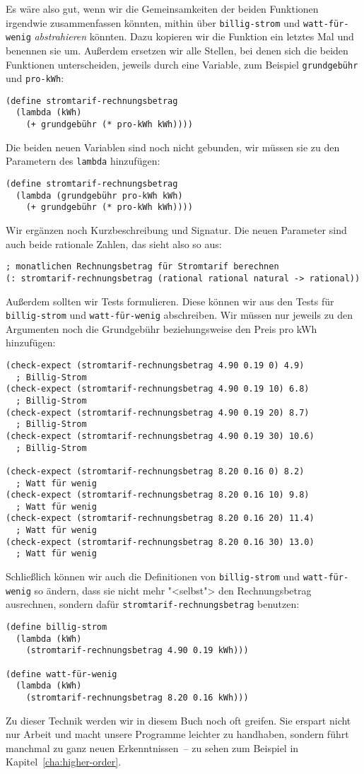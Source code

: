Es wäre also gut, wenn wir die Gemeinsamkeiten der beiden Funktionen
irgendwie zusammenfassen könnten, mithin über \lstinline{billig-strom}
und \lstinline{watt-für-wenig} \textit{abstrahieren}
könnten.  Dazu kopieren wir die Funktion ein letztes Mal und benennen
sie um.  Außerdem ersetzen wir alle Stellen, bei denen sich die beiden
Funktionen unterscheiden, jeweils durch eine Variable, zum Beispiel
\lstinline{grundgebühr} und \lstinline{pro-kWh}:
%
\begin{lstlisting}
(define stromtarif-rechnungsbetrag
  (lambda (kWh)
    (+ grundgebühr (* pro-kWh kWh))))
\end{lstlisting}
%
Die beiden neuen Variablen sind noch nicht gebunden, wir müssen sie zu
den Parametern des \lstinline{lambda} hinzufügen:
%
\begin{lstlisting}
(define stromtarif-rechnungsbetrag
  (lambda (grundgebühr pro-kWh kWh)
    (+ grundgebühr (* pro-kWh kWh))))
\end{lstlisting}
%
Wir ergänzen noch Kurzbeschreibung und Signatur.  Die neuen Parameter
sind auch beide rationale Zahlen, das sieht also so aus:
%
\begin{lstlisting}
; monatlichen Rechnungsbetrag für Stromtarif berechnen
(: stromtarif-rechnungsbetrag (rational rational natural -> rational))
\end{lstlisting}
%
Außerdem sollten wir Tests formulieren.  Diese können wir aus den
Tests für \lstinline{billig-strom} und \lstinline{watt-für-wenig}
abschreiben.
Wir müssen nur jeweils zu den Argumenten noch die Grundgebühr
beziehungsweise den Preis pro kWh hinzufügen:
%
\begin{lstlisting}
(check-expect (stromtarif-rechnungsbetrag 4.90 0.19 0) 4.9)
  ; Billig-Strom
(check-expect (stromtarif-rechnungsbetrag 4.90 0.19 10) 6.8)  
  ; Billig-Strom
(check-expect (stromtarif-rechnungsbetrag 4.90 0.19 20) 8.7)  
  ; Billig-Strom
(check-expect (stromtarif-rechnungsbetrag 4.90 0.19 30) 10.6) 
  ; Billig-Strom

(check-expect (stromtarif-rechnungsbetrag 8.20 0.16 0) 8.2)
  ; Watt für wenig
(check-expect (stromtarif-rechnungsbetrag 8.20 0.16 10) 9.8)
  ; Watt für wenig
(check-expect (stromtarif-rechnungsbetrag 8.20 0.16 20) 11.4)
  ; Watt für wenig
(check-expect (stromtarif-rechnungsbetrag 8.20 0.16 30) 13.0)
  ; Watt für wenig
\end{lstlisting}
%
Schließlich können wir auch die Definitionen von \lstinline{billig-strom}
und \lstinline{watt-für-wenig} so ändern, dass sie nicht mehr "<selbst">
den Rechnungsbetrag ausrechnen, sondern dafür
\lstinline{stromtarif-rechnungsbetrag} benutzen:
%
\begin{lstlisting}
(define billig-strom
  (lambda (kWh)
    (stromtarif-rechnungsbetrag 4.90 0.19 kWh)))

(define watt-für-wenig
  (lambda (kWh)
    (stromtarif-rechnungsbetrag 8.20 0.16 kWh)))
\end{lstlisting}
%
Zu dieser Technik werden wir in diesem Buch noch oft greifen.  Sie
erspart nicht nur Arbeit und macht unsere Programme leichter zu
handhaben, sondern führt manchmal zu ganz neuen Erkenntnissen~--
zu sehen zum Beispiel in Kapitel~\ref{cha:higher-order}.

